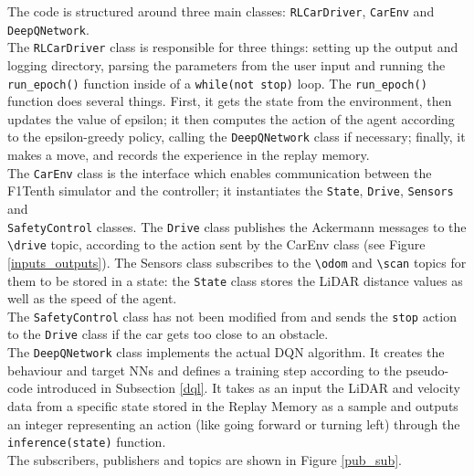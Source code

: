 The code is structured around three main classes: \verb|RLCarDriver|, \verb|CarEnv| and \\ \verb|DeepQNetwork|.	\\
The \verb |RLCarDriver| class is responsible for three things: setting up the output and logging directory, parsing the parameters from the user input and running the \verb |run_epoch()| function inside of a \verb |while(not stop)| loop. The \verb|run_epoch()| function does several things. First, it gets the state from the environment, then updates the value of epsilon; it then computes the action of the agent according to the epsilon-greedy policy, calling the \verb|DeepQNetwork| class if necessary; finally, it makes a move, and records the experience in the replay memory. \\
The \verb |CarEnv| class is the interface which enables communication between the F1Tenth simulator and the controller; it instantiates the \verb|State|, \verb|Drive|, \verb|Sensors| and \\ 
\verb|SafetyControl| classes. The \verb|Drive| class publishes the Ackermann messages to the \verb|\drive| topic, according to the action sent by the CarEnv class (see Figure \ref{inputs_outputs}). The Sensors class subscribes to the \verb|\odom| and \verb|\scan| topics for them to be stored in a state: the \verb|State| class stores the LiDAR distance values as well as the speed of the agent. \\
The \verb|SafetyControl| class has not been modified from \cite{bosello} and sends the \verb|stop| action to the \verb|Drive| class if the car gets too close to an obstacle. \\
The \verb|DeepQNetwork| class implements the actual DQN algorithm. It creates the behaviour and target NNs and defines a training step according to the pseudo-code introduced in Subsection \ref{dql}. It takes as an input the LiDAR and velocity data from a specific state stored in the Replay Memory as a sample and outputs an integer representing an action (like going forward or turning left) through the \verb|inference(state)| function. \\
The subscribers, publishers and topics are shown in Figure \ref{pub_sub}.

